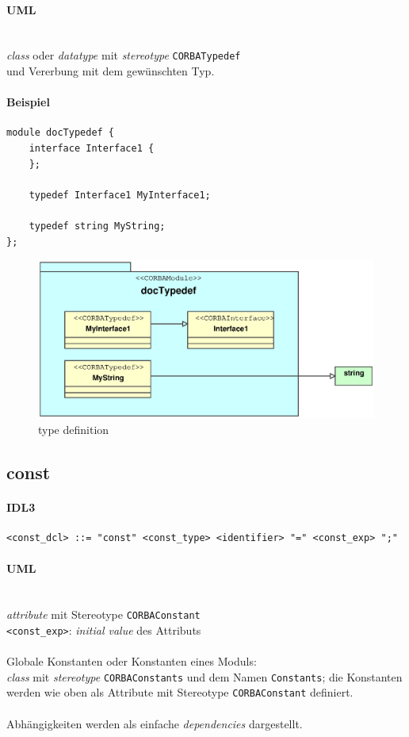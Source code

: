\documentclass [a4paper,10pt] {scrartcl}
\begin{document}
\paragraph{UML}~\\
\emph{class} oder \emph{datatype} mit \emph{stereotype} \texttt{CORBATypedef}\\
und Vererbung mit dem gew{\"u}nschten Typ.\\
\paragraph{Beispiel}
\begin{verbatim}
module docTypedef {
    interface Interface1 {
    };

    typedef Interface1 MyInterface1;

    typedef string MyString;
};
\end{verbatim}
\begin{figure}[!h]
\centerline{\includegraphics[width=0.9 \linewidth]{docTypedef.eps}}
\caption{type definition}
\label{fig:typedef}
\end{figure}

\cleardoublepage
\subsection{const}
\paragraph{IDL3}
\begin{verbatim}
<const_dcl> ::= "const" <const_type> <identifier> "=" <const_exp> ";"
\end{verbatim}
\paragraph{UML}~\\
\emph{attribute} mit Stereotype \texttt{CORBAConstant}\\
\verb"<const_exp>": \emph{initial value} des Attributs\\
~\\
Globale Konstanten oder Konstanten eines Moduls:\\
\emph{class} mit \emph{stereotype} \texttt{CORBAConstants} und dem Namen \texttt{Constants};
die Konstanten werden wie oben als Attribute mit Stereotype \texttt{CORBAConstant} definiert.\\
~\\
Abh{\"a}ngigkeiten werden als einfache \emph{dependencies} dargestellt.\\
\end{document}

